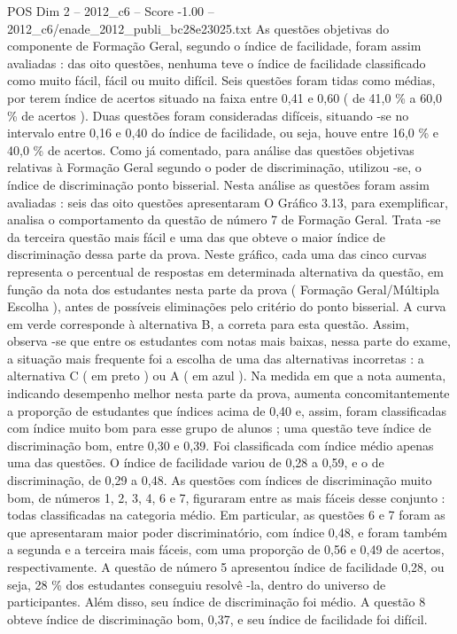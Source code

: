 \begin{textsample}{POS Dim 2 – 2012\_c6 – Score -1.00 – 2012\_c6/enade\_2012\_publi\_bc28e23025.txt}
As questões objetivas do componente de Formação Geral, segundo o índice de facilidade, foram assim avaliadas : das oito questões, nenhuma teve o índice de facilidade classificado como muito fácil, fácil ou muito difícil.
Seis questões foram tidas como médias, por terem índice de acertos situado na faixa entre 0,41 e 0,60 ( de 41,0 \% a 60,0 \% de acertos ).
Duas questões foram consideradas difíceis, situando -se no intervalo entre 0,16 e 0,40 do índice de facilidade, ou seja, houve entre 16,0 \% e 40,0 \% de acertos.
Como já comentado, para análise das questões objetivas relativas à Formação Geral segundo o poder de discriminação, utilizou -se, o índice de discriminação ponto bisserial.
Nesta análise as questões foram assim avaliadas : seis das oito questões apresentaram O Gráfico 3.13, para exemplificar, analisa o comportamento da questão de número 7 de Formação Geral.
Trata -se da terceira questão mais fácil e uma das que obteve o maior índice de discriminação dessa parte da prova.
Neste gráfico, cada uma das cinco curvas representa o percentual de respostas em determinada alternativa da questão, em função da nota dos estudantes nesta parte da prova ( Formação Geral/Múltipla Escolha ), antes de possíveis eliminações pelo critério do ponto bisserial.
A curva em verde corresponde à alternativa B, a correta para esta questão.
Assim, observa -se que entre os estudantes com notas mais baixas, nessa parte do exame, a situação mais frequente foi a escolha de uma das alternativas incorretas : a alternativa C ( em preto ) ou A ( em azul ).
Na medida em que a nota aumenta, indicando desempenho melhor nesta parte da prova, aumenta concomitantemente a proporção de estudantes que índices acima de 0,40 e, assim, foram classificadas com índice muito bom para esse grupo de alunos ; uma questão teve índice de discriminação bom, entre 0,30 e 0,39.
Foi classificada com índice médio apenas uma das questões.
O índice de facilidade variou de 0,28 a 0,59, e o de discriminação, de 0,29 a 0,48.
As questões com índices de discriminação muito bom, de números 1, 2, 3, 4, 6 e 7, figuraram entre as mais fáceis desse conjunto : todas classificadas na categoria médio.
Em particular, as questões 6 e 7 foram as que apresentaram maior poder discriminatório, com índice 0,48, e foram também a segunda e a terceira mais fáceis, com uma proporção de 0,56 e 0,49 de acertos, respectivamente.
A questão de número 5 apresentou índice de facilidade 0,28, ou seja, 28 \% dos estudantes conseguiu resolvê -la, dentro do universo de participantes.
Além disso, seu índice de discriminação foi médio.
A questão 8 obteve índice de discriminação bom, 0,37, e seu índice de facilidade foi difícil.

\end{textsample}
